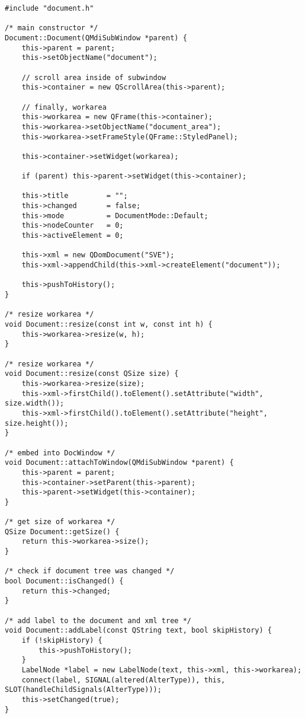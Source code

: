 \begin{lstlisting}
#include "document.h"

/* main constructor */
Document::Document(QMdiSubWindow *parent) {
    this->parent = parent;
    this->setObjectName("document");

    // scroll area inside of subwindow
    this->container = new QScrollArea(this->parent);

    // finally, workarea
    this->workarea = new QFrame(this->container);
    this->workarea->setObjectName("document_area");
    this->workarea->setFrameStyle(QFrame::StyledPanel);

    this->container->setWidget(workarea);

    if (parent) this->parent->setWidget(this->container);

    this->title         = "";
    this->changed       = false;
    this->mode          = DocumentMode::Default;
    this->nodeCounter   = 0;
    this->activeElement = 0;

    this->xml = new QDomDocument("SVE");
    this->xml->appendChild(this->xml->createElement("document"));

    this->pushToHistory();
}

/* resize workarea */
void Document::resize(const int w, const int h) {
    this->workarea->resize(w, h);
}

/* resize workarea */
void Document::resize(const QSize size) {
    this->workarea->resize(size);
    this->xml->firstChild().toElement().setAttribute("width",  size.width());
    this->xml->firstChild().toElement().setAttribute("height", size.height());
}

/* embed into DocWindow */
void Document::attachToWindow(QMdiSubWindow *parent) {
    this->parent = parent;
    this->container->setParent(this->parent);
    this->parent->setWidget(this->container);
}

/* get size of workarea */
QSize Document::getSize() {
    return this->workarea->size();
}

/* check if document tree was changed */
bool Document::isChanged() {
    return this->changed;
}

/* add label to the document and xml tree */
void Document::addLabel(const QString text, bool skipHistory) {
    if (!skipHistory) {
        this->pushToHistory();
    }
    LabelNode *label = new LabelNode(text, this->xml, this->workarea);
    connect(label, SIGNAL(altered(AlterType)), this, SLOT(handleChildSignals(AlterType)));
    this->setChanged(true);
}


\end{lstlisting}
